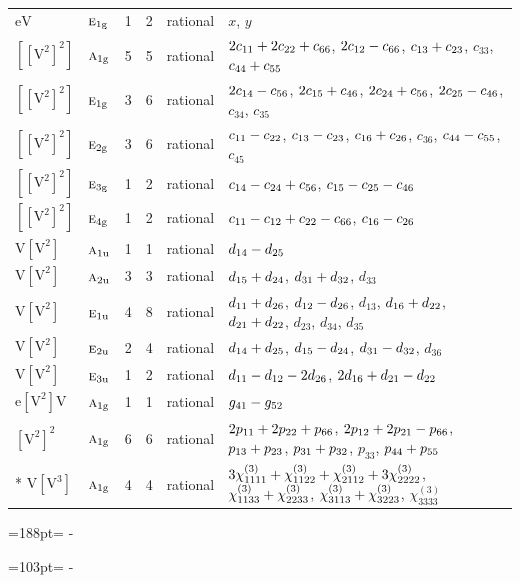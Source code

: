 \documentclass[10pt,a4paper]{article}
\newcommand{\needspace}[1]{\par\penalty-100\begingroup\dimen0=#1\relax\dimen2=\pagegoal
  \advance\dimen2-\pagetotal\ifdim\dimen0>\dimen2\relax\ifdim\dimen2>0pt\vfil\break\fi\fi
  \endgroup}
\numberwithin{equation}{section}
\newcommand{\irr}[1]{\text{\normalfont\scshape #1}}
\newcommand{\ptag}[1]{\mathrm{#1}}
\newcommand{\jahn}[1]{\mathrm{#1}}
\newlength{\fillwidth}\newlength{\cellwidth}\newlength{\colwidth}
\newcommand{\signbreak}{\penalty100\relax}
\begin{document}
{\begin{longtable}{@{}llrrl>{\RaggedRight\arraybackslash}p{\fillwidth}@{}}
$\jahn{eV}$ & $\irr{e}_{1\ptag{g}}$ & 1 & 2 & rational & $x$, $y$\\
$\jahn{[[V^{2}]^{2}]}$ & $\irr{a}_{1\ptag{g}}$ & 5 & 5 & rational & $2c_{11} +\signbreak 2c_{22} +\signbreak c_{66}$, $2c_{12} -\signbreak c_{66}$, $c_{13} +\signbreak c_{23}$, $c_{33}$, $c_{44} +\signbreak c_{55}$\\
$\jahn{[[V^{2}]^{2}]}$ & $\irr{e}_{1\ptag{g}}$ & 3 & 6 & rational & $2c_{14} -\signbreak c_{56}$, $2c_{15} +\signbreak c_{46}$, $2c_{24} +\signbreak c_{56}$, $2c_{25} -\signbreak c_{46}$, $c_{34}$, $c_{35}$\\
$\jahn{[[V^{2}]^{2}]}$ & $\irr{e}_{2\ptag{g}}$ & 3 & 6 & rational & $c_{11} -\signbreak c_{22}$, $c_{13} -\signbreak c_{23}$, $c_{16} +\signbreak c_{26}$, $c_{36}$, $c_{44} -\signbreak c_{55}$, $c_{45}$\\
$\jahn{[[V^{2}]^{2}]}$ & $\irr{e}_{3\ptag{g}}$ & 1 & 2 & rational & $c_{14} -\signbreak c_{24} +\signbreak c_{56}$, $c_{15} -\signbreak c_{25} -\signbreak c_{46}$\\
$\jahn{[[V^{2}]^{2}]}$ & $\irr{e}_{4\ptag{g}}$ & 1 & 2 & rational & $c_{11} -\signbreak c_{12} +\signbreak c_{22} -\signbreak c_{66}$, $c_{16} -\signbreak c_{26}$\\
$\jahn{V[V^{2}]}$ & $\irr{a}_{1\ptag{u}}$ & 1 & 1 & rational & $d_{14} -\signbreak d_{25}$\\
$\jahn{V[V^{2}]}$ & $\irr{a}_{2\ptag{u}}$ & 3 & 3 & rational & $d_{15} +\signbreak d_{24}$, $d_{31} +\signbreak d_{32}$, $d_{33}$\\
$\jahn{V[V^{2}]}$ & $\irr{e}_{1\ptag{u}}$ & 4 & 8 & rational & $d_{11} +\signbreak d_{26}$, $d_{12} -\signbreak d_{26}$, $d_{13}$, $d_{16} +\signbreak d_{22}$, $d_{21} +\signbreak d_{22}$, $d_{23}$, $d_{34}$, $d_{35}$\\
$\jahn{V[V^{2}]}$ & $\irr{e}_{2\ptag{u}}$ & 2 & 4 & rational & $d_{14} +\signbreak d_{25}$, $d_{15} -\signbreak d_{24}$, $d_{31} -\signbreak d_{32}$, $d_{36}$\\
$\jahn{V[V^{2}]}$ & $\irr{e}_{3\ptag{u}}$ & 1 & 2 & rational & $d_{11} -\signbreak d_{12} -\signbreak 2d_{26}$, $2d_{16} +\signbreak d_{21} -\signbreak d_{22}$\\
$\jahn{e[V^{2}]V}$ & $\irr{a}_{1\ptag{g}}$ & 1 & 1 & rational & $\mathnormal{g}_{41} -\signbreak \mathnormal{g}_{52}$\\
$\jahn{[V^{2}]^{2}}$ & $\irr{a}_{1\ptag{g}}$ & 6 & 6 & rational & $2p_{11} +\signbreak 2p_{22} +\signbreak p_{66}$, $2p_{12} +\signbreak 2p_{21} -\signbreak p_{66}$, $p_{13} +\signbreak p_{23}$, $p_{31} +\signbreak p_{32}$, $p_{33}$, $p_{44} +\signbreak p_{55}$\\*
$\jahn{V[V^{3}]}$ & $\irr{a}_{1\ptag{g}}$ & 4 & 4 & rational & $3\chi^{(3)}_{1111} +\signbreak \chi^{(3)}_{1122} +\signbreak \chi^{(3)}_{2112} +\signbreak 3\chi^{(3)}_{2222}$, $\chi^{(3)}_{1133} +\signbreak \chi^{(3)}_{2233}$, $\chi^{(3)}_{3113} +\signbreak \chi^{(3)}_{3223}$, $\chi^{(3)}_{3333}$\\
\bottomrule\end{longtable}}
\needspace{188pt}
\needspace{103pt}
\end{document}
